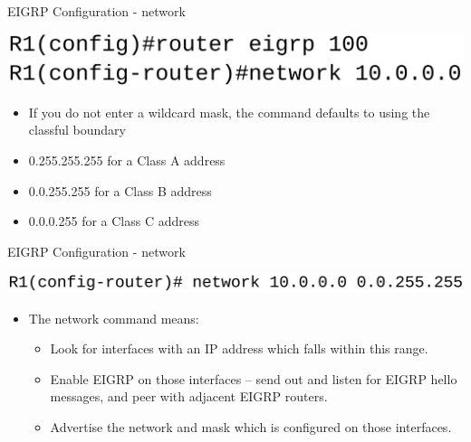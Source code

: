 \documentclass[pdflatex,compress,mathserif]{beamer}
\begin{document}
\begin{frame}{EIGRP Configuration - network}
	\begin{center}
		\includegraphics[width=0.8\linewidth]{img/img12}
	\end{center}
	\begin{itemize}
		\item If you do not enter a wildcard mask, the command defaults to
using the classful boundary
		\item 0.255.255.255 for a Class A address
		\item 0.0.255.255 for a Class B address
		\item 0.0.0.255 for a Class C address
	\end{itemize}
\end{frame}

\begin{frame}{EIGRP Configuration - network}
	\begin{center}
		\includegraphics[width=\linewidth]{img/img13}
	\end{center}
	\begin{itemize}
		\item The network command means:
		\begin{itemize}
			\item Look for interfaces with an IP address which falls within this
range.
			\item Enable EIGRP on those interfaces – send out and listen for
EIGRP hello messages, and peer with adjacent EIGRP
routers.
			\item Advertise the network and mask which is configured on
those interfaces.
		\end{itemize}
	\end{itemize}
\end{frame}
\end{document}
